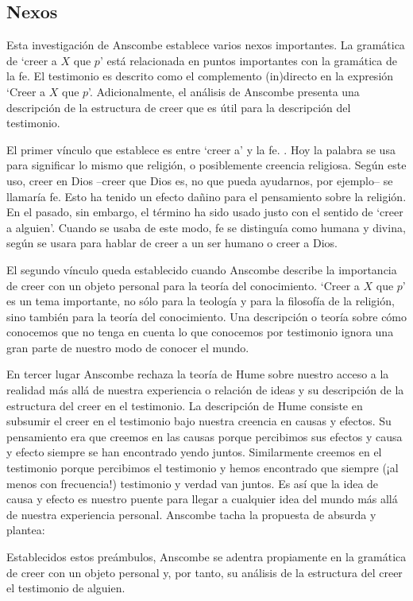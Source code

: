 \subsection{Nexos}
Esta investigación de Anscombe establece varios nexos importantes. La gramática
de `creer a $X$ que $p$' está relacionada en puntos importantes con la gramática
de la fe. El testimonio es descrito como el complemento (in)directo en la
expresión `Creer a $X$ que $p$'. Adicionalmente, el análisis de Anscombe
presenta una descripción de la estructura de creer que es útil para la
descripción del testimonio.

El primer vínculo que establece es entre `creer a' y la fe. . Hoy la palabra se usa para significar lo mismo que religión, o
posiblemente creencia religiosa. Según este uso, creer en Dios --creer que Dios
es, no que pueda ayudarnos, por ejemplo-- se llamaría fe. Esto ha tenido un
efecto dañino para el pensamiento sobre la religión. En el pasado, sin embargo,
el término ha sido usado justo con el sentido de `creer a alguien'. Cuando se
usaba de este modo, fe se distinguía como humana y divina, según se usara para
hablar de creer a un ser humano o creer a Dios.

El segundo vínculo queda establecido cuando Anscombe describe la importancia de
creer con un objeto personal para la teoría del conocimiento. `Creer a $X$ que
$p$' es un tema importante, no sólo para la teología y para la filosofía de la
religión, sino también para la teoría del conocimiento. Una descripción o teoría
sobre cómo conocemos que no tenga en cuenta lo que conocemos por testimonio
ignora una gran parte de nuestro modo de conocer el mundo. 

En tercer lugar Anscombe rechaza la teoría de Hume sobre nuestro acceso a la
realidad más allá de nuestra experiencia o relación de ideas y su descripción de
la estructura del creer en el testimonio. La descripción de Hume consiste en
subsumir el creer en el testimonio bajo nuestra creencia en causas y efectos. Su
pensamiento era que creemos en las causas porque percibimos sus efectos y causa
y efecto siempre se han encontrado yendo juntos. Similarmente creemos en el
testimonio porque percibimos el testimonio y hemos encontrado que siempre (¡al
menos con frecuencia!) testimonio y verdad van juntos. Es así que la idea de
causa y efecto es nuestro puente para llegar a cualquier idea del mundo más allá
de nuestra experiencia personal. Anscombe tacha la propuesta de absurda y
plantea: 

Establecidos estos preámbulos, Anscombe se adentra propiamente en la gramática
de creer con un objeto personal y, por tanto, su análisis de la estructura del
creer el testimonio de alguien.
